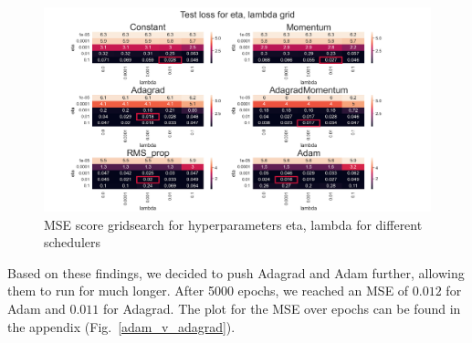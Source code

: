 \documentclass[onecolumn,10pt,cleanfoot]{asme2ej}
\begin{document}
\begin{figure}[H]
\centerline{\includegraphics[width=8in]{figure/new_100e_gridsearch.png}}
\caption{MSE score gridsearch for hyperparameters eta, lambda for different schedulers}
\label{heatmap}
\end{figure}

Based on these findings, we decided to push Adagrad and Adam further, allowing them to run for much longer. After 5000 epochs, we reached an MSE of $0.012$ for Adam and $0.011$ for Adagrad. The plot for the MSE over epochs can be found in the appendix (Fig.~\ref{adam_v_adagrad}).


\end{document}
